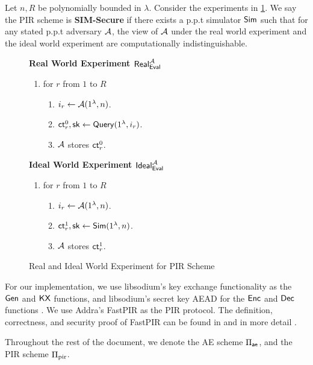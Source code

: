 \begin{definition}
\label{defn:PIR-SIM-security}
Let $n, R$ be polynomially bounded in $\lambda$. Consider the experiments in \cref{expr:pir-real-ideal-world}. We say the PIR scheme is \textbf{SIM-Secure} if there exists a p.p.t simulator $\mathsf{Sim}$ such that for any stated p.p.t adversary $\mathcal{A}$, the view of $\mathcal{A}$ under the real world experiment and the ideal world experiment are computationally indistinguishable. 

\begin{figure}[h!]
\begin{framed}
\textbf{Real World Experiment $\mathsf{Real}^{\mathcal{A}}_{\mathsf{Eval}}$}
\begin{enumerate}
    \item for $r$ from $1$ to $R$
    \begin{enumerate}
        \item $i_r \leftarrow \mathcal{A}(1^{\lambda}, n)$.
        \item $\mathsf{ct}_r^0, {\mathsf{sk}} \leftarrow \mathsf{Query}(1^{\lambda}, i_r)$.
        \item $\mathcal{A}$ stores $\mathsf{ct}_r^0$.
    \end{enumerate}
\end{enumerate}
\textbf{Ideal World Experiment $\mathsf{Ideal}^{\mathcal{A}}_{\mathsf{Eval}}$}
\begin{enumerate}
    \item for $r$ from $1$ to $R$
    \begin{enumerate}
        \item $i_r \leftarrow \mathcal{A}(1^{\lambda}, n)$.
        \item $\mathsf{ct}_r^1, {\mathsf{sk}} \leftarrow \mathsf{Sim}(1^{\lambda}, n)$.
        \item $\mathcal{A}$ stores $\mathsf{ct}_r^1$.
    \end{enumerate}
\end{enumerate}
\end{framed}
\caption{Real and Ideal World Experiment for PIR Scheme}
\label{expr:pir-real-ideal-world}
\end{figure}
\end{definition}
For our implementation, we use libsodium's key exchange functionality as the $\mathsf{Gen}$ and $\mathsf{KX}$ functions, and libsodium's secret key AEAD for the $\mathsf{Enc}$ and $\mathsf{Dec}$ functions \cite{libsodium}. We use Addra's FastPIR as the PIR protocol. The definition, correctness, and security proof of FastPIR can be found in \cite[Section 4]{ahmad2021addra} and in more detail \cite{angel2018thesis}.

Throughout the rest of the document, we denote the AE scheme $\Pi_{\mathsf{ae}}$, and the PIR scheme $\Pi_{\text{pir}}$.

